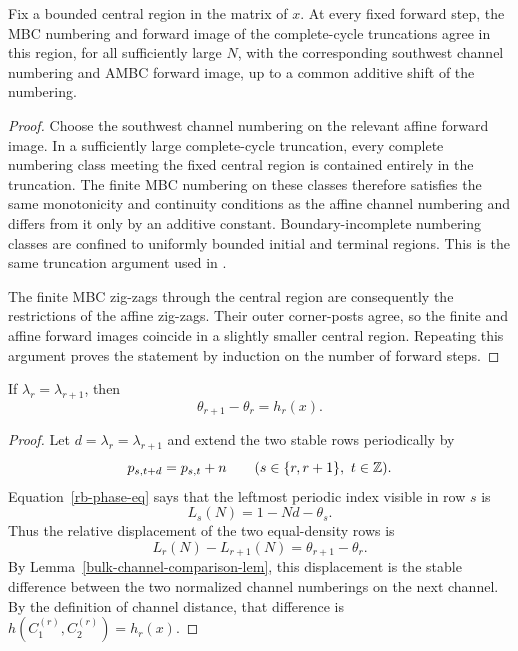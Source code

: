 \documentclass[11pt]{article}
\begin{document}
\begin{lemma}
\label{bulk-channel-comparison-lem}
Fix a bounded central region in the matrix of $x$.  At every fixed forward
step, the MBC numbering and forward image of the complete-cycle
truncations agree in this region, for all sufficiently large $N$, with the
corresponding southwest channel numbering and AMBC forward image, up to a
common additive shift of the numbering.
\end{lemma}

\begin{proof}
Choose the southwest channel numbering on the relevant affine forward
image.  In a sufficiently large complete-cycle truncation, every complete
numbering class meeting the fixed central region is contained entirely in
the truncation.  The finite MBC numbering on these classes therefore
satisfies the same monotonicity and continuity conditions as the affine
channel numbering and differs from it only by an additive constant.
Boundary-incomplete numbering classes are confined to uniformly bounded
initial and terminal regions.  This is the same truncation argument used
in \cite[Lemma~12.12]{CPY}.

The finite MBC zig-zags through the central region are consequently the
restrictions of the affine zig-zags.  Their outer corner-posts agree, so
the finite and affine forward images coincide in a slightly smaller
central region.  Repeating this argument proves the statement by induction
on the number of forward steps.
\end{proof}

\begin{lemma}
\label{phase-distance-lem}
If $\lambda_r=\lambda_{r+1}$, then
\[
\theta_{r+1}-\theta_r=h_r(x).
\]
\end{lemma}

\begin{proof}
Let $d=\lambda_r=\lambda_{r+1}$ and extend the two stable rows periodically
by
\[
p_{s,t+d}=p_{s,t}+n
\qquad(s\in\{r,r+1\},\ t\in\mathbb{Z}).
\]
Equation~\eqref{rb-phase-eq} says that the leftmost periodic index visible
in row $s$ is
\[
L_s(N)=1-Nd-\theta_s.
\]
Thus the relative displacement of the two equal-density rows is
\[
L_r(N)-L_{r+1}(N)=\theta_{r+1}-\theta_r.
\]
By Lemma~\ref{bulk-channel-comparison-lem}, this displacement is the
stable difference between the two normalized channel numberings on the
next channel.  By the definition of channel distance, that difference is
$h(C_1^{(r)},C_2^{(r)})=h_r(x)$.
\end{proof}
\end{document}
